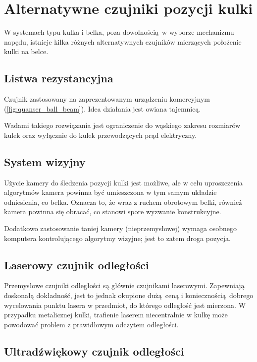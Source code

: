 \chapter{Alternatywne czujniki pozycji kulki}
\label{appB_alternatywne_czujniki_pozycji_kulki}

W systemach typu kulka i belka, poza dowolnością w wyborze mechanizmu napędu, istnieje kilka różnych alternatywnych czujników mierzących położenie kulki na belce.

\section{Listwa rezystancyjna}

Czujnik zastosowany na zaprezentowanym urządzeniu komercyjnym (\cref{fig:quanser_ball_beam}). Idea działania jest owiana tajemnicą.

Wadami takiego rozwiązania jest ograniczenie do wąskiego zakresu rozmiarów kulek oraz wyłącznie do kulek przewodzących prąd elektryczny.

\section{System wizyjny}

Użycie kamery do śledzenia pozycji kulki jest możliwe, ale w celu uproszczenia algorytmów kamera powinna być umieszczona w tym samym układzie odniesienia, co belka. Oznacza to, że wraz z ruchem obrotowym belki, również kamera powinna się obracać, co stanowi spore wyzwanie konstrukcyjne.

Dodatkowo zastosowanie taniej kamery (nieprzemysłowej) wymaga osobnego komputera kontrolującego algorytmy wizyjne; jest to zatem droga pozycja.

\section{Laserowy czujnik odległości}

Przemysłowe czujniki odległości są głównie czujnikami laserowymi. Zapewniają doskonałą dokładność, jest to jednak okupione dużą ceną i koniecznością dobrego wycelowania punktu lasera w przedmiot, do którego odległość jest mierzona. W przypadku metalicznej kulki, trafienie laserem niecentralnie w kulkę może powodować problem z prawidłowym odczytem odległości.

\section{Ultradźwiękowy czujnik odległości}

